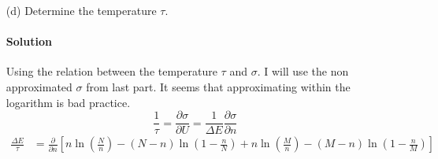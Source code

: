 \documentclass{article}
\begin{document}
\begin{enumerate}
\clearpage
		
		\item[(d)] Determine the temperature $\tau$.
		\paragraph{Solution} Using the relation between the temperature $\tau$ and $\sigma$. I will use the non approximated $\sigma$ from last part. It seems that approximating within the logarithm is bad practice.
		\[
			\frac{1}{\tau} = \frac{\partial \sigma}{\partial U} = \frac{1}{\Delta E} \frac{\partial \sigma}{\partial n}
		\]
		\begin{align*}
			\frac{\Delta E}{\tau} &= \frac{\partial}{\partial n} \left[ n\ln(\frac{N}{n}) - (N-n)\ln(1 - \frac{n}{N}) + n\ln(\frac{M}{n}) - (M-n)\ln(1 - \frac{n}{M}) \right] \\

\end{align*}
\end{enumerate}
\end{document}

